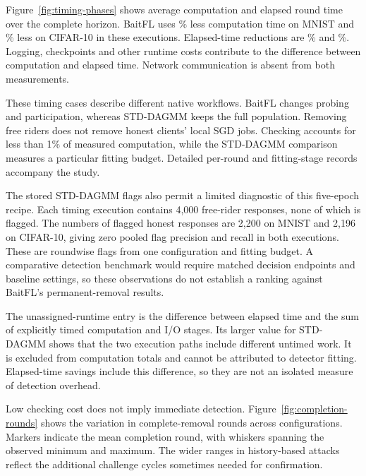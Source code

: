 \documentclass[journal]{IEEEtran}
\begin{document}
Figure~\ref{fig:timing-phases} shows average
computation and elapsed round time over the complete horizon. BaitFL uses
\TimingMnistReduction\% less computation time on MNIST and
\TimingCifarReduction\% less on CIFAR-10 in these executions. Elapsed-time
reductions are \TimingMnistWallReduction\% and
\TimingCifarWallReduction\%. Logging, checkpoints and other runtime costs
contribute to the difference between computation and elapsed time. Network
communication is absent from both measurements.



These timing cases describe different native workflows. BaitFL changes
probing and participation, whereas STD-DAGMM keeps the full population.
Removing free riders does not remove honest clients' local SGD jobs.
Checking accounts for less than 1\% of measured computation,
while the STD-DAGMM comparison measures a particular fitting budget.
Detailed per-round and fitting-stage records accompany the study.

The stored STD-DAGMM flags also permit a limited diagnostic of this
five-epoch recipe. Each timing execution contains 4,000 free-rider
responses, none of which is flagged. The numbers of flagged honest
responses are 2,200 on MNIST and 2,196 on CIFAR-10, giving zero pooled
flag precision and recall in both executions. These are roundwise flags
from one configuration and fitting budget. A comparative detection
benchmark would require matched decision endpoints and baseline settings,
so these observations do not establish a ranking against BaitFL's
permanent-removal results.

The unassigned-runtime entry is the difference between elapsed time and
the sum of explicitly timed computation and I/O stages. Its larger value
for STD-DAGMM shows that the two execution paths include different
untimed work. It is excluded from computation totals and cannot be
attributed to detector fitting. Elapsed-time savings include this
difference, so they are not an isolated measure of detection overhead.

Low checking cost does not imply immediate detection.
Figure~\ref{fig:completion-rounds} shows the variation in complete-removal
rounds across configurations. Markers indicate the mean completion round,
with whiskers spanning the observed minimum and maximum.
The wider ranges in history-based attacks
reflect the additional challenge cycles sometimes needed for confirmation.

\end{document}
